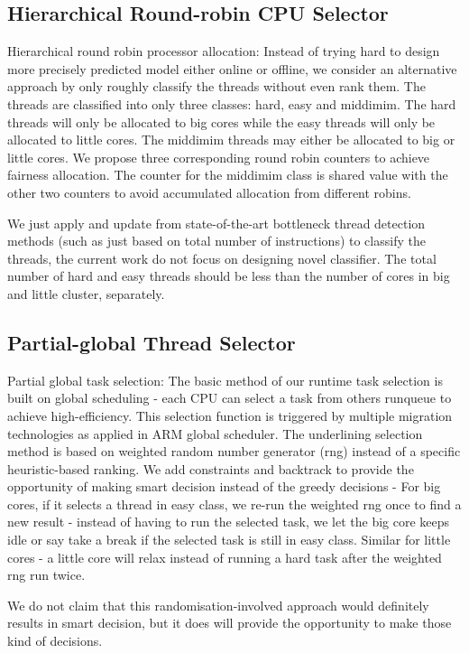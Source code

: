 \documentclass[pageno]{jpaper}
\begin{document}
\subsection{Hierarchical Round-robin CPU Selector}
Hierarchical round robin processor allocation: Instead of trying hard to design more precisely predicted model either online or offline, we consider an alternative approach by only roughly classify the threads without even rank them. The threads are classified into only three classes: hard, easy and middimim.  The hard threads will only be allocated to big cores while the easy threads will only be allocated to little cores. The middimim threads may either be allocated to big or little cores. We propose three corresponding round robin counters to achieve fairness allocation. The counter for the middimim class is shared value with the other two counters to avoid accumulated allocation from different robins. 

We just apply and update from state-of-the-art bottleneck thread detection methods (such as just based on total number of instructions) to classify the threads, the current work do not focus on designing novel classifier. The total number of hard and easy threads should be less than the number of cores in big and little cluster, separately.


\subsection{Partial-global Thread Selector}
Partial global task selection: The basic method of our runtime task selection is built on global scheduling - each CPU can select a task from others runqueue to achieve high-efficiency. This selection function is triggered by multiple migration technologies as applied in ARM global scheduler. The underlining selection method is based on weighted random number generator (rng) instead of a specific heuristic-based ranking. We add constraints and backtrack to provide the opportunity of making smart decision instead of the greedy decisions - For big cores, if it selects a thread in easy class, we re-run the weighted rng once to find a new result  - instead of having to run the selected task, we let the big core keeps idle or say take a break if the selected task is still in easy class. Similar for little cores - a little core will relax instead of running a hard task after the weighted rng run twice. 

We do not claim that this randomisation-involved approach would definitely results in smart decision, but it does will provide the opportunity to make those kind of decisions. 
\end{document}
